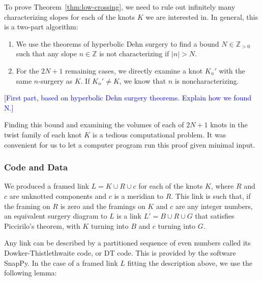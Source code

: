 \documentclass[11pt,usenames,dvipsnames,reqno]{amsart}
\newcommand{\zz}{\mathbb{Z}}
\numberwithin{theorem}{section}
\theoremstyle{ex}
\theoremstyle{rem}
\def\kh#1{\textcolor{Blue}{#1}}
\begin{document}
To prove Theorem~\ref{thm:low-crossing}, we need to rule out infinitely many characterizing slopes for each of the knots $K$ we are interested in. In general, this is a two-part algorithm:

\begin{enumerate}
	\item We use the theorems of hyperbolic Dehn surgery to find a bound $N \in \zz_{>0}$ such that any slope $n \in \zz$ is not characterizing if $|n|>N$.
	\item For the $2 N + 1$ remaining cases, we directly examine a knot $K_{n}'$ with the same $n$-surgery as $K$. If $K_{n}' \neq K$, we know that $n$ is noncharacterizing.
\end{enumerate}

\kh{[First part, based on hyperbolic Dehn surgery theorems. Explain how we found N.]}

Finding this bound and examining the volumes of each of $2 N + 1$ knots in the twist family of each knot $K$ is a tedious computational problem. It was convenient for us to let a computer program run this proof given minimal input.

\subsubsection{Code and Data}
We produced a framed link $L = K \cup R \cup c$ for each of the knots $K$, where $R$ and $c$ are unknotted components and $c$ is a meridian to $R$. This link is such that, if the framing on $R$ is zero and the framings on $K$ and $c$ are any integer numbers, an equivalent surgery diagram to $L$ is a link $L' = B \cup R \cup G$ that satisfies Piccirilo's theorem, with $K$ turning into $B$ and $c$ turning into $G$.

Any link can be described by a partitioned sequence of even numbers called its Dowker-Thistlethwaite  code, or DT code. This is provided by the software SnapPy. In the case of a framed link $L$ fitting the description above, we use the following lemma:
\end{document}
